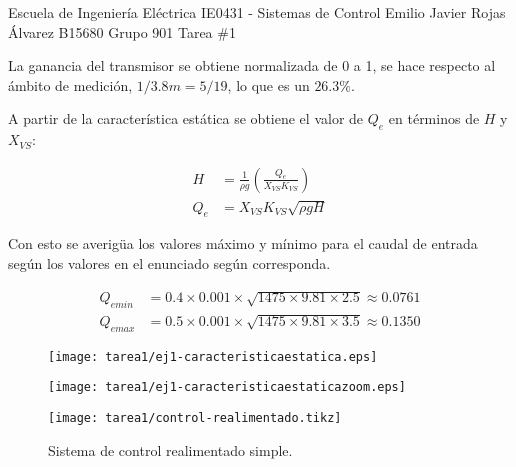 \documentclass{ucrEieTarea}
\begin{document}
    {Escuela de Ingeniería Eléctrica}
    {IE0431 - Sistemas de Control}
    {Emilio Javier Rojas Álvarez}
    {B15680}
    {Grupo 901}
    {Tarea \#1}
  
  \begin{ejercicio}

  La ganancia del transmisor se obtiene normalizada de 0 a 1, se hace respecto al ámbito de medición, $1/3.8m = 5/19$, lo que es un $26.3\%$.
  
  A partir de la característica estática se obtiene el valor de $Q_e$ en términos de $H$ y $X_{VS}$:

  \begin{align*}
    H &=\frac{1}{\rho g} \left( \frac{Q_e}{X_{VS}K_{VS}} \right)
    \\
    Q_e &= X_{VS} K_{VS}\sqrt{\rho g H}
  \end{align*}

  Con esto se averigüa los valores máximo y mínimo para el caudal de entrada según los valores en el enunciado según corresponda.

  \begin{align*}
    Q_{emin} &= 0.4 \times 0.001 \times \sqrt{1475\times9.81\times2.5} \approx 0.0761
    \\
    Q_{emax} &= 0.5 \times 0.001 \times \sqrt{1475\times9.81\times3.5} \approx 0.1350
  \end{align*}





    \begin{figure}[H]
      \centering
      \texttt{[image: tarea1/ej1-caracteristicaestatica.eps]}
    \end{figure}

        \begin{figure}[H]
      \centering
      \texttt{[image: tarea1/ej1-caracteristicaestaticazoom.eps]}
    \end{figure}
  \end{ejercicio}
  
  \begin{ejercicio}
    \begin{figure}[H]
        \centering
        \texttt{[image: tarea1/control-realimentado.tikz]}
        \caption{Sistema de control realimentado simple.}
        \label{img:ejercicio1}
    \end{figure}
  \end{ejercicio}
\end{document}
